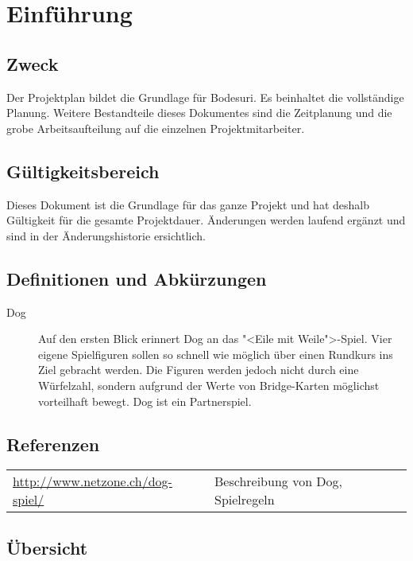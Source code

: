 \documentclass[a4paper,12pt,halfparskip,DIV14]{scrartcl}
\begin{document}



\section{Einführung}

\subsection{Zweck}

Der Projektplan bildet die Grundlage für Bodesuri. Es beinhaltet die vollständige Planung. Weitere Bestandteile dieses Dokumentes sind die Zeitplanung und die grobe Arbeitsaufteilung auf die einzelnen Projektmitarbeiter.

\subsection{Gültigkeitsbereich}

Dieses Dokument ist die Grundlage für das ganze Projekt und hat deshalb Gültigkeit für die gesamte Projektdauer. Änderungen werden laufend ergänzt und sind in der Änderungshistorie ersichtlich.

\subsection{Definitionen und Abkürzungen}

\begin{description}
	\item[Dog] Auf den ersten Blick erinnert Dog an das "<Eile mit Weile">-Spiel. Vier eigene Spielfiguren sollen so schnell wie möglich über einen Rundkurs ins Ziel gebracht werden. Die Figuren werden jedoch nicht durch eine Würfelzahl, sondern aufgrund der Werte von Bridge-Karten möglichst vorteilhaft bewegt. Dog ist ein Partnerspiel.
\end{description}

\subsection{Referenzen}

\begin{tabular}{@{}ll@{}}
\url{http://www.netzone.ch/dog-spiel/} & Beschreibung von Dog, Spielregeln
\end{tabular}

\subsection{Übersicht}
\end{document}
